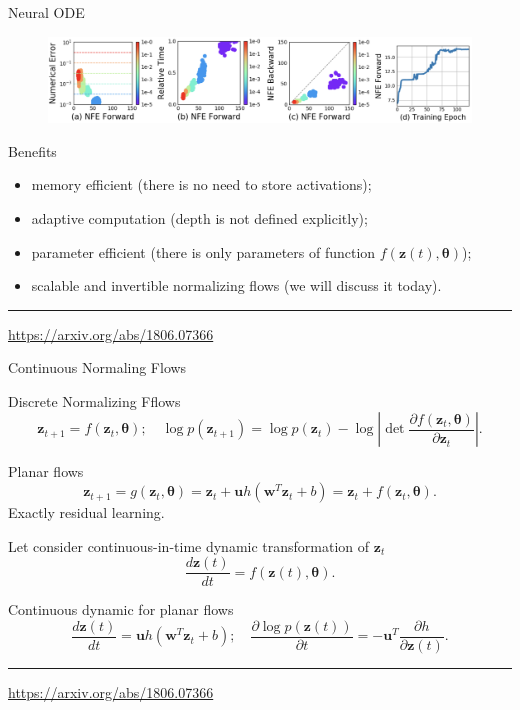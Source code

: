 \documentclass{beamer}
\newcommand{\bw}{\mathbf{w}}
\newcommand{\bz}{\mathbf{z}}
\newcommand{\btheta}{\boldsymbol{\theta}}
\begin{document}
\begin{frame}{Neural ODE}
	
	\begin{figure}
		\centering
		\includegraphics[width=\linewidth]{figs/neural_ode}
	\end{figure}
	
	\begin{block}{Benefits}
		\begin{itemize}
			\item memory efficient (there is no need to store activations);
			\item adaptive computation (depth is not defined explicitly);
			\item parameter efficient (there is only parameters of function $f(\bz(t), \btheta)$);
			\item scalable and invertible normalizing flows (we will discuss it today).
		\end{itemize}
	\end{block}
	\vfill
	\hrule\medskip
	{\scriptsize \href{https://arxiv.org/abs/1806.07366}{https://arxiv.org/abs/1806.07366}}   
\end{frame}
\begin{frame}{Continuous Normaling Flows}
	\begin{block}{Discrete Normalizing Fflows}
		\vspace{-0.4cm}
		  \[
		  \bz_{t+1} = f(\bz_t, \btheta); \quad \log p(\bz_{t+1}) = \log p(\bz_{t}) - \log \left| \det \frac{\partial f(\bz_t, \btheta)}{\partial \bz_{t}} \right| .
		  \]
		\vspace{-0.4cm}
	\end{block}
	\begin{block}{Planar flows}
		\vspace{-0.3cm}
		\[
		\bz_{t + 1} = g(\bz_t, \btheta) = \bz_t + \mathbf{u} h(\bw^T\bz_t + b) = \bz_t + f(\bz_t, \btheta).
		\]
		Exactly residual learning.
	\end{block}
	Let consider continuous-in-time dynamic transformation of $\bz_t$
	\[
		\frac{d\bz(t)}{dt} = f(\bz(t), \btheta).
	\]
	\vspace{-0.3cm}
	\begin{block}{Continuous dynamic for planar flows}
		\vspace{-0.3cm}
		\[
			\frac{d\bz(t)}{dt}  = \mathbf{u} h(\bw^T\bz_t + b); \quad \frac{\partial \log p (\bz(t))}{ \partial t} = - \mathbf{u}^T \frac{\partial h}{\partial \bz(t)}.
		\]
	\end{block}
	\vfill
	\hrule\medskip
	{\scriptsize \href{https://arxiv.org/abs/1806.07366}{https://arxiv.org/abs/1806.07366}} 
\end{frame}
\end{document}

